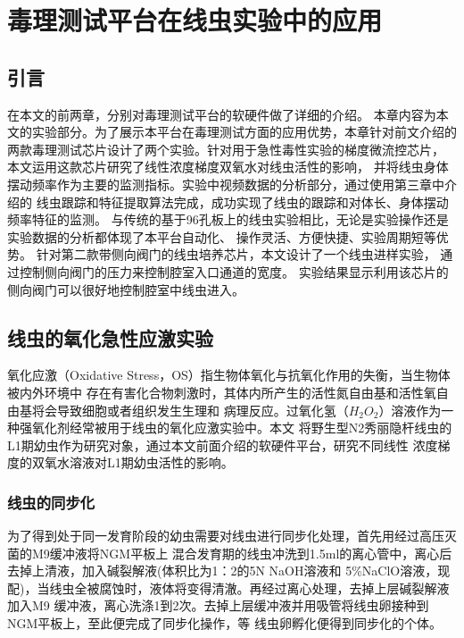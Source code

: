 \chapter{毒理测试平台在线虫实验中的应用}
\section{引言}
	在本文的前两章，分别对毒理测试平台的软硬件做了详细的介绍。
	本章内容为本文的实验部分。为了展示本平台在毒理测试方面的应用优势，本章针对前文介绍的
	两款毒理测试芯片设计了两个实验。针对用于急性毒性实验的梯度微流控芯片，
	本文运用这款芯片研究了线性浓度梯度双氧水对线虫活性的影响，
	并将线虫身体摆动频率作为主要的监测指标。实验中视频数据的分析部分，通过使用第三章中介绍的
	线虫跟踪和特征提取算法完成，成功实现了线虫的跟踪和对体长、身体摆动频率特征的监测。
	与传统的基于96孔板上的线虫实验相比，无论是实验操作还是实验数据的分析都体现了本平台自动化、
	操作灵活、方便快捷、实验周期短等优势。
	针对第二款带侧向阀门的线虫培养芯片，本文设计了一个线虫进样实验，
	通过控制侧向阀门的压力来控制腔室入口通道的宽度。
	实验结果显示利用该芯片的侧向阀门可以很好地控制腔室中线虫进入。
\section{线虫的氧化急性应激实验}
	氧化应激（Oxidative Stress，OS）指生物体氧化与抗氧化作用的失衡，当生物体被内外环境中
	存在有害化合物刺激时，其体内所产生的活性氮自由基和活性氧自由基将会导致细胞或者组织发生生理和
	病理反应。过氧化氢（$H_2O_2$）溶液作为一种强氧化剂经常被用于线虫的氧化应激实验中。本文
	将野生型N2秀丽隐杆线虫的L1期幼虫作为研究对象，通过本文前面介绍的软硬件平台，研究不同线性
	浓度梯度的双氧水溶液对L1期幼虫活性的影响。
\subsection{线虫的同步化}
	为了得到处于同一发育阶段的幼虫需要对线虫进行同步化处理，首先用经过高压灭菌的M9缓冲液将NGM平板上
	混合发育期的线虫冲洗到1.5ml的离心管中，离心后去掉上清液，加入碱裂解液(体积比为1：2的5N NaOH溶液和
	5\%NaClO溶液，现配)，当线虫全被腐蚀时，液体将变得清澈。再经过离心处理，去掉上层碱裂解液加入M9
	缓冲液，离心洗涤1到2次。去掉上层缓冲液并用吸管将线虫卵接种到NGM平板上，至此便完成了同步化操作，等
	线虫卵孵化便得到同步化的个体。
